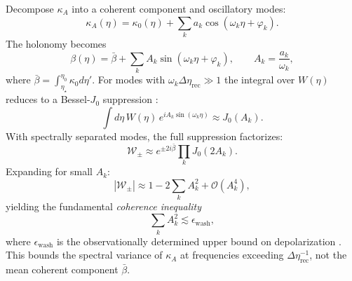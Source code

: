 \documentclass[12pt]{article}
\theoremstyle{definition}
\newcommand{\kA}{\kappa_A}
\newcommand{\Wrec}{\Delta\eta_{\mathrm{rec}}}
\newcommand{\etastar}{\eta_\star}
\newcommand{\etaobs}{\eta_0}
\newcommand{\Wpm}{\mathcal{W}_\pm}
\begin{document}
Decompose $\kA$ into a coherent component and oscillatory modes:
\begin{equation}
  \kA(\eta) = \kappa_0(\eta)
    + \sum_k a_k\cos(\omega_k\eta+\varphi_k).
  \label{eq:kA_decomp}
\end{equation}
The holonomy becomes
\begin{equation}
  \beta(\eta) = \bar\beta
    + \sum_k A_k\sin(\omega_k\eta+\varphi_k),
  \qquad
  A_k=\frac{a_k}{\omega_k},
  \label{eq:beta_decomp}
\end{equation}
where $\bar\beta=\int_{\etastar}^{\etaobs}\kappa_0d\eta'$.
For modes with $\omega_k\Wrec\gg1$ the integral over $W(\eta)$
reduces to a Bessel-$J_0$ suppression
\cite{Abramowitz1972,Watson1944}:
\begin{equation}
  \int d\eta\,W(\eta)\,e^{iA_k\sin(\omega_k\eta)}
  \approx J_0(A_k).
\end{equation}
With spectrally separated modes, the full suppression factorizes:
\begin{equation}
  \Wpm \approx e^{\pm2i\bar\beta}\prod_k J_0(2A_k).
  \label{eq:Wpm_bessel}
\end{equation}
Expanding for small $A_k$:
\begin{equation}
  |\Wpm| \approx 1 - 2\sum_k A_k^2 + \mathcal{O}(A_k^4),
  \label{eq:Wpm_expand}
\end{equation}
yielding the fundamental \emph{coherence inequality}
\begin{equation}
  \boxed{
  \sum_k A_k^2 \lesssim \epsilon_{\mathrm{wash}},}
  \label{eq:coherence_ineq}
\end{equation}
where $\epsilon_{\mathrm{wash}}$ is the observationally determined upper bound
on depolarization \cite{MinamiKomatsu2020,Eskilt2022,Sherfield2023}.
This bounds the spectral variance of $\kA$ at
frequencies exceeding $\Wrec^{-1}$, not the mean coherent component
$\bar\beta$.
\end{document}

